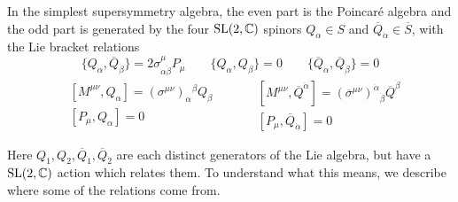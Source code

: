 In the simplest supersymmetry algebra, the even part is the Poincar\'e algebra and
the odd part is generated by the four $\operatorname{SL}(2,\mathbb{C})$ spinors
$Q_{\alpha} \in S$ and
$\overline{Q}_{\dot{\alpha}} \in \overline{S}$, with the Lie bracket relations
\[
	\{Q_\alpha,\overline{Q}_{\dot{\beta}}\} 
	= 2\sigma^{\mu}_{\alpha \dot{\beta}} P_{\mu} 
	\qquad
	\{Q_\alpha,Q_{\beta}\} = 0
	\qquad
	\{\overline{Q}_{\dot{\alpha}}, \overline{Q}_{\dot{\beta}}\} = 0 
\] 
\begin{equation*}
	\begin{split}
		&[M^{\mu\nu}, Q_{\alpha}] 
		= (\sigma^{\mu\nu})_{\alpha}{}^{\beta}Q_\beta \\
		&[P_{\mu}, Q_{\alpha}] 
		= 0 
	\end{split}
	\qquad
	\begin{split}
		&[M^{\mu\nu}, \overline{Q}^{\dot{\alpha}}] = 
		(\overline{\sigma}^{\mu\nu})^{\dot{\alpha}}{}_{\dot{\beta}}\overline{Q}^{\dot{\beta}}\\
		&[P_\mu, \overline{Q}_{\dot{\alpha}}] = 0
	\end{split}
\end{equation*}
\begin{comment}
- Why not specify [Q bar, P], or [Q bar, M], are they implied from [Q,P] \\
They can be deduced by assuming Q bar and Q are hermitian conjugates in a rep
- In a basis where $Q_{\alpha}^{\dagger} = \overline{Q}_{\dot{\alpha}}$, what
it mean to take adjoint of a vector/spinor \\
the point is that we choose a rep of the algebra such that this is the case.
- Why are the other operators self adjoint?
In a unitary rep, the other operators will all be hermitian.
- where do the commutation relations come from? \\
explained below, and in tanedo notes. They come from looking at the spinor
transformations and transformations of a unitary rep
\end{comment}
Here $Q_1,Q_2,\overline{Q}_{\dot{1}},\overline{Q}_{\dot{2}}$ are each distinct
generators of the Lie algebra, but have a $\operatorname{SL}(2,\mathbb{C})$ action which
relates them. To understand what this means, we describe where some of the 
relations come from.

